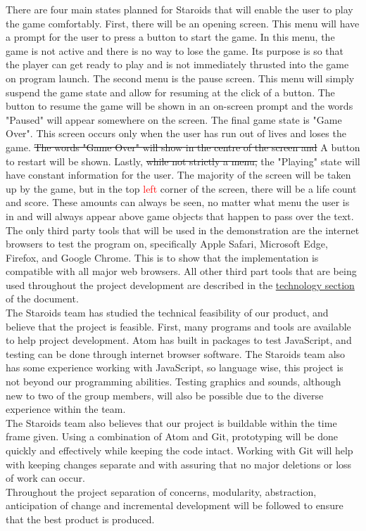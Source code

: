 \documentclass{article}
\begin{document}
There are four main states planned for Staroids that will enable the user to play the game comfortably. First, there will be an opening screen. This menu will have a prompt for the user to press a button to start the game. In this menu, the game is not active and there is no way to lose the game. Its purpose is so that the player can get ready to play and is not immediately thrusted into the game on program launch. The second menu is the pause screen. This menu will simply suspend the game state and allow for resuming at the click of a button. The button to resume the game will be shown in an on-screen prompt and the words "Paused" will appear somewhere on the screen. The final game state is "Game Over". This screen occurs only when the user has run out of lives and loses the game. \sout{The words "Game Over" will show in the centre of the screen and} A button to restart will be shown. Lastly, \sout{while not strictly a menu,} the "Playing" state will have constant information for the user. The majority of the screen will be taken up by the game, but in the top \textcolor{red}{left} corner of the screen, there will be a life count and score. These amounts can always be seen, no matter what menu the user is in and will always appear above game objects that happen to pass over the text.\\

The only third party tools that will be used in the demonstration are the internet browsers to test the program on, specifically Apple Safari, Microsoft Edge, Firefox, and Google Chrome. This is to show that the implementation is compatible with all major web browsers. All other third part tools that are being used throughout the project development are described in the \hyperref[technology:ide]{technology section} of the document.\\

The Staroids team has studied the technical feasibility of our product, and believe that the project is feasible. First, many programs and tools are available to help project development. Atom has built in packages to test JavaScript, and testing can be done through internet browser software. The Staroids team also has some experience working with JavaScript, so language wise, this project is not beyond our programming abilities. Testing graphics and sounds, although new to two of the group members, will also be possible due to the diverse experience within the team.\\
The Staroids team also believes that our project is buildable within the time frame given. Using a combination of Atom and Git, prototyping will be done quickly and effectively while keeping the code intact. Working with Git will help with keeping changes separate and with assuring that no major deletions or loss of work can occur.\\
Throughout the project separation of concerns, modularity, abstraction, anticipation of change and incremental development will be followed to ensure that the best product is produced.
\end{document}
